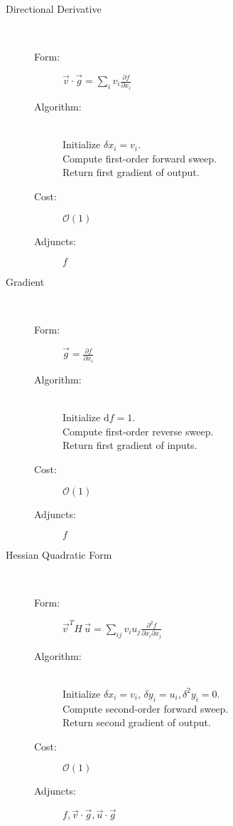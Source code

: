 \documentclass[11pt]{article}
\begin{document}
\begin{description}
	
	\item[Directional Derivative] \hfill \\
	
	\begin{description}
		\item[Form:] $\displaystyle \vec{v} \cdot \vec{g} = \sum_{i} v_{i} \frac{ \partial f }{ \partial x_{i} } $
		\item[Algorithm:] \hfill \\
		Initialize $\delta x_{i} = v_{i}$. \\
		Compute first-order forward sweep. \\
		Return first gradient of output.
		\item[Cost:] $\mathcal{O} \! \left( 1 \right)$
		\item[Adjuncts:] $ f $
	\end{description}

	\item[Gradient] \hfill \\
	\begin{description}
		\item[Form:] $\displaystyle \vec{g} = \frac{ \partial f }{ \partial x_{i} } $
		\item[Algorithm:] \hfill \\
		Initialize $\mathrm{d} f = 1$. \\
		Compute first-order reverse sweep. \\
		Return first gradient of inputs.
		\item[Cost:] $\mathcal{O} \! \left( 1 \right)$
		\item[Adjuncts:] $ f $
	\end{description}
	
	\item[Hessian Quadratic Form] \hfill \\
	\begin{description}
		\item[Form:] 
		$\displaystyle \vec{v\,}^{T} H \, \vec{u} = \sum_{ij} v_{i} u_{j} \frac{ \partial^{2} f }{ \partial x_{i} \partial x_{j} } $
		\item[Algorithm:] \hfill \\
		Initialize $\delta x_{i} = v_{i}, \, \delta y_{i} = u_{i}, \delta^{2} y_{i} = 0$. \\
		Compute second-order forward sweep. \\
		Return second gradient of output.
		\item[Cost:] $\mathcal{O} \! \left( 1 \right)$
		\item[Adjuncts:] $ f, \vec{v} \cdot \vec{g}, \vec{u} \cdot \vec{g}$
	\end{description}
	

\end{description}
\end{document}
